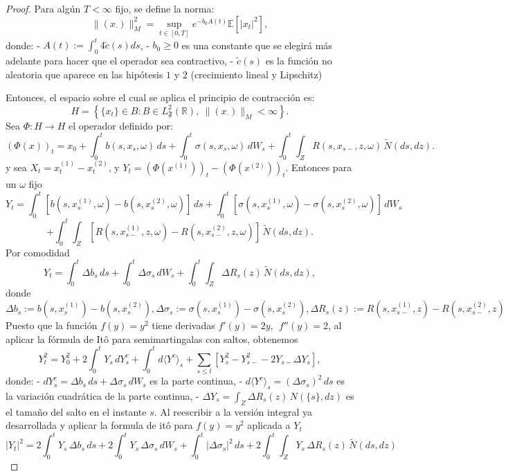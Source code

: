 \documentclass[
  spanish,
  us-letterpaper,
]{scrreprt}
\theoremstyle{plain}
\theoremstyle{plain}
\theoremstyle{definition}
\theoremstyle{remark}
\begin{document}
\begin{proof}
Para algún \(T < \infty\) fijo, se define la norma:
\[\| (x_{\cdot}) \|_M^2 = \sup_{t \in [0,T]} e^{-b_0 A(t)} \mathbb{E}[|x_t|^2],\]
donde: - \(A(t) := \int_0^t 4\widetilde{c}(s) ds\), - \(b_0 \geq 0\) es
una constante que se elegirá más adelante para hacer que el operador sea
contractivo, - \(\widetilde{c}(s)\) es la función no aleatoria que
aparece en las hipótesis \(1\) y \(2\) (crecimiento lineal y Lipschitz)

Entonces, el espacio sobre el cual se aplica el principio de contracción
es:
\[H = \left\{ \{x_t\} \in B :B \in L_{\mathfrak{F}}^{2}(\mathbb{R}), \  \| (x_{\cdot}) \|_M < \infty \right\}.\]
Sea \(\Phi: H \to H\) el operador definido por:
\[(\Phi(x))_t = x_0 + \int_0^t b(s, x_s, \omega)\,ds + \int_0^t \sigma(s, x_s, \omega)\,dW_s + \int_0^t \int_Z R(s, x_{s-}, z, \omega)\,\tilde{N}(ds, dz).\]
y sea \(X_t = x_t^{(1)} - x_t^{(2)}\), y
\(Y_t = (\Phi(x^{(1)}))_t - (\Phi(x^{(2)}))_t\). Entonces para un
\(\omega\) fijo
\[Y_t = \int_0^t [b(s, x_s^{(1)}, \omega) - b(s, x_s^{(2)}, \omega)]\,ds + \int_0^t [\sigma(s, x_s^{(1)}, \omega) - \sigma(s, x_s^{(2)}, \omega)]\,dW_s\]
\[+ \int_0^t \int_Z [R(s, x_{s-}^{(1)}, z, \omega) - R(s, x_{s-}^{(2)}, z, \omega)]\,\tilde{N}(ds, dz).\]
Por comodidad
\[Y_t = \int_0^t \Delta b_s\,ds + \int_0^t \Delta \sigma_s\,dW_s + \int_0^t \int_Z \Delta R_s(z)\,\tilde{N}(ds, dz),\]
donde
\(\Delta b_s := b(s, x_s^{(1)}) - b(s, x_s^{(2)}), \Delta \sigma_s := \sigma(s, x_s^{(1)}) - \sigma(s, x_s^{(2)}), \Delta R_s(z) := R(s, x_{s-}^{(1)}, z) - R(s, x_{s-}^{(2)}, z)\)
Puesto que la función \(f(y) = y^2\) tiene derivadas
\(f'(y) = 2y, \ \ f''(y) = 2\), al aplicar la fórmula de Itô para
semimartingalas con saltos, obtenemos
\[Y_t^2 = Y_0^2 + 2 \int_0^t Y_s \, dY_s^c + \int_0^t d\langle Y^c \rangle_s + \sum_{s \leq t} \left[ Y_s^2 - Y_{s-}^2 - 2 Y_{s-} \Delta Y_s \right],\]
donde: - \(dY_s^c = \Delta b_s \, ds + \Delta \sigma_s \, dW_s\) es la
parte continua, - \(d\langle Y^c \rangle_s = (\Delta \sigma_s)^2 \, ds\)
es la variación cuadrática de la parte continua, -
\(\Delta Y_s = \int_Z \Delta R_s(z) \, N(\{s\}, dz)\) es el tamaño del
salto en el instante \(s\). Al reescribir a la versión integral ya
desarrollada y aplicar la formula de itô para \(f(y) = y^2\) aplicada a
\(Y_t\) \[|Y_t|^2 = 2 \int_0^t Y_s \, \Delta b_s \, ds 
+ 2 \int_0^t Y_s \, \Delta \sigma_s \, dW_s 
+ \int_0^t |\Delta \sigma_s|^2 \, ds
+ 2 \int_0^t \int_Z Y_s \, \Delta R_s(z) \, \tilde{N}(ds, dz)\]


\end{proof}
\end{document}
